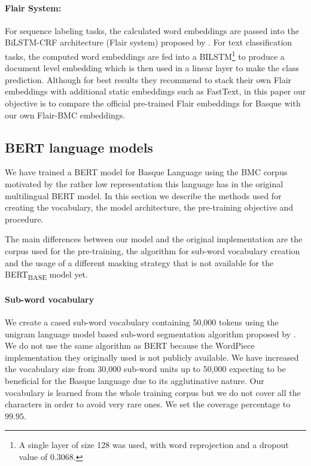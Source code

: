 \documentclass[10pt, a4paper]{article}
\begin{document}
\paragraph{Flair System:} For sequence labeling tasks, the calculated word embeddings are passed into the BiLSTM-CRF architecture (Flair system) proposed by \cite{huang2015bidirectional}. For text classification tasks, the computed word embeddings are fed into a BILSTM\footnote{A single layer of size 128 was used, with word reprojection and a dropout value of 0.3068.} to produce a document level embedding which is then used in a linear layer to make the class prediction. Although for best results they recommend to stack their own Flair embeddings with additional static embeddings such as FastText, in this paper our objective is to compare the official pre-trained Flair embeddings for Basque with our own Flair-BMC embeddings.

\subsection{BERT language models}\label{sec:build-basq-models:bert}

We have trained a BERT \cite{devlin2019bert} model for Basque Language using the BMC corpus motivated by the rather low representation this language has in the original multilingual BERT model. In this section we describe the methods used for creating the vocabulary, the model architecture, the pre-training objective and procedure.

The main differences between our model and the original implementation are the corpus used for the pre-training, the algorithm for sub-word vocabulary creation and the usage of a different masking strategy that is not available for the BERT\textsubscript{BASE} model yet.

\paragraph{Sub-word vocabulary}

We create a cased sub-word vocabulary containing 50,000 tokens using the unigram language model based sub-word segmentation algorithm proposed by . We do not use the same algorithm as BERT because the WordPiece \cite{wu2016google} implementation they originally used is not publicly available. We have increased the vocabulary size from 30,000 sub-word units up to 50,000 expecting to be beneficial for the Basque language due to its agglutinative nature. Our vocabulary is learned from the whole training corpus but we do not cover all the characters in order to avoid very rare ones. We set the coverage percentage to $99.95$.
\end{document}
